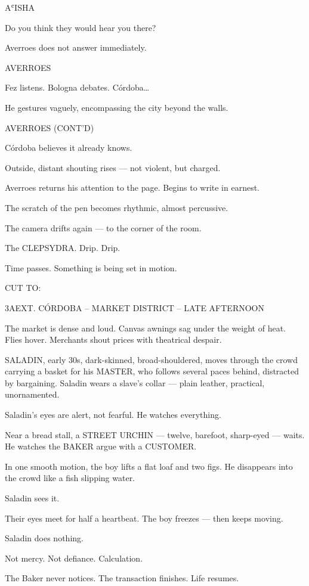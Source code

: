 \documentclass[12pt]{article}
\newlength{\charindent}
\newlength{\dialogueindent}
\newlength{\dialoguewidth}
\newlength{\transitionindent}
\newcommand{\slug}[1]{%
  \needspace{4\baselineskip}%
  \vspace{1.5em}%
  \noindent\MakeUppercase{#1}%
  \nopagebreak[4]%
  \par\vspace{0.75em}%
}
\newcommand{\action}[1]{%
  \noindent#1\par\vspace{0.75em}%
}
\newcommand{\character}[1]{%
  \needspace{3\baselineskip}%
  \par\vspace{0.5em}%
  \noindent\hspace*{\charindent}\MakeUppercase{#1}\nopagebreak[4]%
}
\newcommand{\dialogue}[1]{%
  \par\nobreak\nopagebreak[4]%
  \noindent\hspace*{\dialogueindent}%
  \begin{minipage}[t]{\dialoguewidth}
  #1
  \end{minipage}%
  \par\vspace{0.5em}%
}
\newcommand{\transition}[1]{%
  \needspace{2\baselineskip}%
  \par\vspace{1em}%
  \noindent\hspace*{\transitionindent}\MakeUppercase{#1}%
  \par%
}
\newcommand{\contd}{\textsc{(cont'd)}}
\begin{document}
\character{AʿISHA}
\dialogue{Do you think they would hear you there?}

\action{Averroes does not answer immediately.}

\character{AVERROES}
\dialogue{Fez listens. Bologna debates. C\'ordoba…}

\action{He gestures vaguely, encompassing the city beyond the walls.}

\character{AVERROES \contd}
\dialogue{C\'ordoba believes it already knows.}

\action{Outside, distant shouting rises — not violent, but charged.}

\action{Averroes returns his attention to the page. Begins to write in earnest.}

\action{The scratch of the pen becomes rhythmic, almost percussive.}

\action{The camera drifts again — to the corner of the room.}

\action{The CLEPSYDRA. Drip. Drip.}

\action{Time passes. Something is being set in motion.}

\transition{CUT TO:}
\slug{3A\quad EXT. C\'ORDOBA -- MARKET DISTRICT -- LATE AFTERNOON}

\action{The market is dense and loud. Canvas awnings sag under the weight of heat. Flies hover. Merchants shout prices with theatrical despair.}

\action{SALADIN, early 30s, dark-skinned, broad-shouldered, moves through the crowd carrying a basket for his MASTER, who follows several paces behind, distracted by bargaining. Saladin wears a slave’s collar — plain leather, practical, unornamented.}

\action{Saladin’s eyes are alert, not fearful. He watches everything.}

\action{Near a bread stall, a STREET URCHIN — twelve, barefoot, sharp-eyed — waits. He watches the BAKER argue with a CUSTOMER.}

\action{In one smooth motion, the boy lifts a flat loaf and two figs. He disappears into the crowd like a fish slipping water.}

\action{Saladin sees it.}

\action{Their eyes meet for half a heartbeat. The boy freezes — then keeps moving.}

\action{Saladin does nothing.}

\action{Not mercy. Not defiance. Calculation.}

\action{The Baker never notices. The transaction finishes. Life resumes.}
\end{document}
